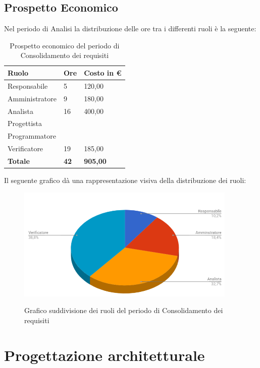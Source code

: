 \documentclass[PianoDiProgetto.tex]{subfiles}
\begin{document}
\subsection{Prospetto Economico}
Nel periodo di Analisi la distribuzione delle ore tra i differenti ruoli è la seguente:
\begin{center}
\begin{table}[htbp]
	\centering
	\renewcommand\arraystretch{1.5}
	\begin{tabularx}{\textwidth}{p{5cm}|p{4cm}|p{4cm}}
		\hline
		\textbf{Ruolo} & \textbf{Ore} & \textbf{Costo in \euro} \\
		\hline
		Responsabile & 5 & 120,00 \\
		\hline
		Amministratore & 9 & 180,00 \\
		\hline
		Analista & 16 & 400,00 \\
		\hline
		Progettista & \ & \ \\
		\hline
		Programmatore & \ & \ \\
		\hline
		Verificatore & 19 & 185,00 \\
		\hline
		\textbf{Totale} & \textbf{42} & \textbf{905,00}\\
		\hline
	\end{tabularx}
\caption{Prospetto economico del periodo di Consolidamento dei requisiti}
\label{my-label}
\end{table} 
\end{center}
\clearpage
Il seguente grafico dà una rappresentazione visiva della distribuzione dei ruoli:
\begin{figure}[h]
	\centering
	\includegraphics[width=10.5cm]{images/prospettoEconomico/consolidamento.png}
	\label{fig:foo}
	\caption{Grafico suddivisione dei ruoli del periodo di Consolidamento dei requisiti}
\end{figure} 
\clearpage
\section{Progettazione architetturale}
\end{document}
